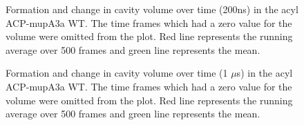 \begin{singlespacing}
		\setlength\fboxsep{5pt}
		\setlength\fboxrule{1.5pt}
		\begin{figure}[htbp]
		\centering
		\caption[Formation and change in cavity volume over time (200ns) in the acyl ACP-mupA3a WT.]{Formation and change in cavity volume over time (200ns) in the acyl ACP-mupA3a WT. The time frames which had a zero value for the volume were omitted from the plot. Red line represents the running average over 500 frames and green line represents the mean.}
		\label{fig:CavityVolumeACPSPMWild200_nonzero}
		\end{figure}

		\setlength\fboxsep{5pt}
		\setlength\fboxrule{1.5pt}
		\begin{figure}[htbp]
		\centering
		\caption[Formation and change in cavity volume over time (1 $ \mu $s) in the acyl ACP-mupA3a WT.]{Formation and change in cavity volume over time (1 $ \mu $s) in the acyl ACP-mupA3a WT. The time frames which had a zero value for the volume were omitted from the plot. Red line represents the running average over 500 frames and green line represents the mean.}
		\label{fig:CavityVolumeACPSPMWild1000_nonzero}
		\end{figure}
				


\end{singlespacing}
